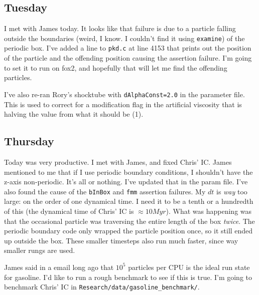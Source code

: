 \documentclass[11pt,letterpaper]{article}
\begin{document}
\subsection{Tuesday}

I met with James today. It looks like that failure is due to a particle
falling outside the boundaries (weird, I know. I couldn't find it using
\texttt{examine}) of the periodic box. I've added a line to
\texttt{pkd.c} at line 4153 that prints out the position of the particle
and the offending position causing the assertion failure. I'm going to
set it to run on fox2, and hopefully that will let me find the offending
particles.

I've also re-ran Rory's shocktube with \texttt{dAlphaConst=2.0} in the
parameter file. This is used to correct for a modification flag in the
artificial viscosity that is halving the value from what it should be
(1).

\subsection{Thursday}

Today was very productive. I met with James, and fixed Chris' IC. James
mentioned to me that if I use periodic boundary conditions, I shouldn't
have the z-axis non-periodic. It's all or nothing. I've updated that in
the param file. I've also found the cause of the \texttt{bInBox} and
\texttt{fmm} assertion failures. My $dt$ is \textit{way} too large: on
the order of one dynamical time. I need it to be a tenth or a hundredth
of this (the dynamical time of Chris' IC is $\approx 10 Myr$). What was
happening was that the occasional particle was traversing the entire
length of the box \textit{twice}. The periodic boundary code only
wrapped the particle position once, so it still ended up outside the
box. These smaller timesteps also run much faster, since way smaller
rungs are used.

James said in a email long ago that $10^5$ particles per CPU is the
ideal run state for gasoline. I'd like to run a rough benchmark to see
if this is true. I'm going to benchmark Chris' IC in
\texttt{Research/data/gasoline\_benchmark/}.
\end{document}
